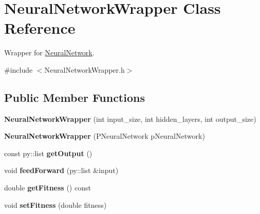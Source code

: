 \hypertarget{classNeuralNetworkWrapper}{}\section{Neural\+Network\+Wrapper Class Reference}
\label{classNeuralNetworkWrapper}


Wrapper for \hyperlink{classNeuralNetwork}{Neural\+Network}.  




{\ttfamily \#include $<$Neural\+Network\+Wrapper.\+h$>$}

\subsection*{Public Member Functions}
\begin{DoxyCompactItemize}
\item 
{\bfseries Neural\+Network\+Wrapper} (int input\+\_\+size, int hidden\+\_\+layers, int output\+\_\+size)\hypertarget{classNeuralNetworkWrapper_a669dc7ff0b6f17d182bbae149f344f51}{}\label{classNeuralNetworkWrapper_a669dc7ff0b6f17d182bbae149f344f51}

\item 
{\bfseries Neural\+Network\+Wrapper} (P\+Neural\+Network p\+Neural\+Network)\hypertarget{classNeuralNetworkWrapper_a012b510ced2c1c39d0d2df160246cb29}{}\label{classNeuralNetworkWrapper_a012b510ced2c1c39d0d2df160246cb29}

\item 
const py\+::list {\bfseries get\+Output} ()\hypertarget{classNeuralNetworkWrapper_ae16c5f85afd47b5b569020f6f92c9720}{}\label{classNeuralNetworkWrapper_ae16c5f85afd47b5b569020f6f92c9720}

\item 
void {\bfseries feed\+Forward} (py\+::list \&input)\hypertarget{classNeuralNetworkWrapper_a22d7e6ff1fad1ca9c1e654d59114510e}{}\label{classNeuralNetworkWrapper_a22d7e6ff1fad1ca9c1e654d59114510e}

\item 
double {\bfseries get\+Fitness} () const \hypertarget{classNeuralNetworkWrapper_adb481c656d747eb2c028f1fb9f7f71f8}{}\label{classNeuralNetworkWrapper_adb481c656d747eb2c028f1fb9f7f71f8}

\item 
void {\bfseries set\+Fitness} (double fitness)\hypertarget{classNeuralNetworkWrapper_ab8417a449fc7d6693e5f186856a6cbb9}{}\label{classNeuralNetworkWrapper_ab8417a449fc7d6693e5f186856a6cbb9}

\end{DoxyCompactItemize}


